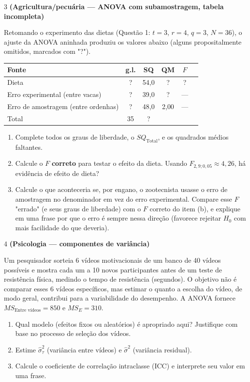 \documentclass[11pt]{article}
\begin{document}
\begin{questao}{3} \textbf{(Agricultura/pecuária --- ANOVA com subamostragem, tabela incompleta)}

Retomando o experimento das dietas (Questão 1: $t=3$, $r=4$, $q=3$, $N=36$), o ajuste da ANOVA
aninhada produziu os valores abaixo (alguns propositalmente omitidos, marcados com "?").

\begin{center}
\begin{tabular}{lccccc}
\toprule
Fonte & g.l. & SQ & QM & $F$ \\
\midrule
Dieta & ? & 54{,}0 & ? & ? \\
Erro experimental (entre vacas) & ? & 39{,}0 & ? & --- \\
Erro de amostragem (entre ordenhas) & ? & 48{,}0 & 2{,}00 & --- \\
Total & 35 & ? & & \\
\bottomrule
\end{tabular}
\end{center}

\begin{enumerate}[label=(\alph*)]
  \item Complete todos os graus de liberdade, o $SQ_{\text{Total}}$, e os quadrados médios
    faltantes.
  \item Calcule o $F$ \textbf{correto} para testar o efeito da dieta. Usando
    $F_{2,9;0{,}05}\approx 4{,}26$, há evidência de efeito de dieta?
  \item Calcule o que aconteceria se, por engano, o zootecnista usasse o erro de amostragem no
    denominador em vez do erro experimental. Compare esse $F$ "errado" (e seus graus de liberdade)
    com o $F$ correto do item (b), e explique em uma frase por que o erro é sempre nessa direção
    (favorece rejeitar $H_0$ com mais facilidade do que deveria).
\end{enumerate}
\end{questao}

\begin{questao}{4} \textbf{(Psicologia --- componentes de variância)}

Um pesquisador sorteia 6 vídeos motivacionais de um banco de 40 vídeos possíveis e mostra cada
um a 10 novos participantes antes de um teste de resistência física, medindo o tempo de
resistência (segundos). O objetivo não é comparar esses 6 vídeos específicos, mas estimar o
quanto a escolha do vídeo, de modo geral, contribui para a variabilidade do desempenho. A ANOVA
fornece $MS_{\text{Entre vídeos}} = 850$ e $MS_E = 310$.

\begin{enumerate}[label=(\alph*)]
  \item Qual modelo (efeitos fixos ou aleatórios) é apropriado aqui? Justifique com base no
    processo de seleção dos vídeos.
  \item Estime $\hat\sigma_\tau^2$ (variância entre vídeos) e $\hat\sigma^2$ (variância residual).
  \item Calcule o coeficiente de correlação intraclasse (ICC) e interprete seu valor em uma frase.
\end{enumerate}
\end{questao}
\end{document}
